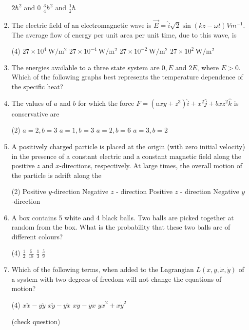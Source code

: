 \begin{enumerate}
\begin{tasks}
	\task[\textbf{c.}] $2 \hbar^{2}$ and 0
	\task[\textbf{d.}] $\frac{3}{4} \hbar^{2}$ and $\frac{1}{2} \hbar$
\end{tasks}
\item The electric field of an electromagnetic wave is $\vec{E}=\hat{i} \sqrt{2} \sin (k z-\omega t) V m^{-1}$. The average flow of energy per unit area per unit time, due to this wave, is
 \begin{tasks}(4)
	\task[\textbf{a.}]$27 \times 10^{4} \mathrm{~W} / \mathrm{m}^{2}$
	\task[\textbf{b.}]$27 \times 10^{-4} \mathrm{~W} / \mathrm{m}^{2}$
	\task[\textbf{c.}]$27 \times 10^{-2} \mathrm{~W} / \mathrm{m}^{2}$
	\task[\textbf{d.}] $27 \times 10^{2} \mathrm{~W} / \mathrm{m}^{2}$
\end{tasks}
\item The energies available to a three state system are $0, E$ and $2 E$, where $E>0$. Which of the following graphs best represents the temperature dependence of the specific heat?	
\item The values of $a$ and $b$ for which the force $F=\left(a x y+z^{3}\right) \hat{i}+x^{2} \hat{j}+b x z^{2} \hat{k}$ is conservative are
 \begin{tasks}(2)
	\task[\textbf{a.}]$a=2, b=3$
	\task[\textbf{b.}]$a=1, b=3$
	\task[\textbf{c.}]$a=2, b=6$
	\task[\textbf{d.}]$a=3, b=2$
\end{tasks}
\item A positively charged particle is placed at the origin (with zero initial velocity) in the presence of a constant electric and a constant magnetic field along the positive $z$ and $x$-directions, respectively. At large times, the overall motion of the particle is adrift along the
 \begin{tasks}(2)
	\task[\textbf{a.}] Positive $y$-direction
	\task[\textbf{b.}] Negative $z$ - direction
	\task[\textbf{c.}]Positive $z$ - direction
	\task[\textbf{d.}]  Negative $y$-direction
\end{tasks}
\item A box contains 5 white and 4 black balls. Two balls are picked together at random from the box. What is the probability that these two balls are of different colours?
 \begin{tasks}(4)
	\task[\textbf{a.}] $\frac{1}{2}$
	\task[\textbf{b.}]$\frac{5}{18}$
	\task[\textbf{c.}]$\frac{1}{3}$
	\task[\textbf{d.}]  $\frac{5}{9}$
\end{tasks}
\item Which of the following terms, when added to the Lagrangian $L(x, y, \dot{x}, \dot{y})$ of a system with two degrees of freedom will not change the equations of motion?
 \begin{tasks}(4)
	\task[\textbf{a.}]$x \ddot{x}-y \ddot{y}$
	\task[\textbf{b.}]$x \ddot{y}-y \ddot{x}$
	\task[\textbf{c.}]$x \dot{y}-y \dot{x}$
	\task[\textbf{d.}] $y \dot{x}^{2}+x \dot{y}^{2}$
\end{tasks}
(check question)	

\end{enumerate}

